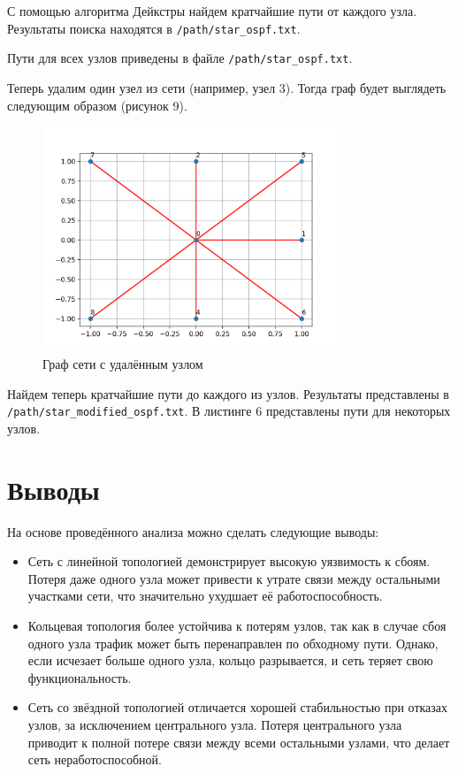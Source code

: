 \documentclass[a4paper,14pt]{extarticle}
\begin{document}
С помощью алгоритма Дейкстры найдем кратчайшие пути от каждого узла. Результаты поиска находятся в \texttt{/path/star\_ospf.txt}.



Пути для всех узлов приведены в файле \texttt{/path/star\_ospf.txt}.

Теперь удалим один узел из сети (например, узел 3). Тогда граф будет выглядеть следующим образом (рисунок 9).

\clearpage
\begin{figure}[htbp]
    \centering
    \includegraphics[width=0.8\textwidth]{img/star_modified.png}
    \caption{Граф сети с удалённым узлом}
    \label{fig:hamiltonianGraph}
\end{figure}

Найдем теперь кратчайшие пути до каждого из узлов. Результаты представлены в \texttt{/path/star\_modified\_ospf.txt}. В листинге 6 представлены пути для некоторых узлов.



\section{Выводы}

На основе проведённого анализа можно сделать следующие выводы:

\begin{itemize}
    \item Сеть с линейной топологией демонстрирует высокую уязвимость к сбоям. Потеря даже одного узла может привести к утрате связи между остальными участками сети, что значительно ухудшает её работоспособность.
    \item Кольцевая топология более устойчива к потерям узлов, так как в случае сбоя одного узла трафик может быть перенаправлен по обходному пути. Однако, если исчезает больше одного узла, кольцо разрывается, и сеть теряет свою функциональность.
    \item Сеть со звёздной топологией отличается хорошей стабильностью при отказах узлов, за исключением центрального узла. Потеря центрального узла приводит к полной потере связи между всеми остальными узлами, что делает сеть неработоспособной.
\end{itemize}
\end{document}
